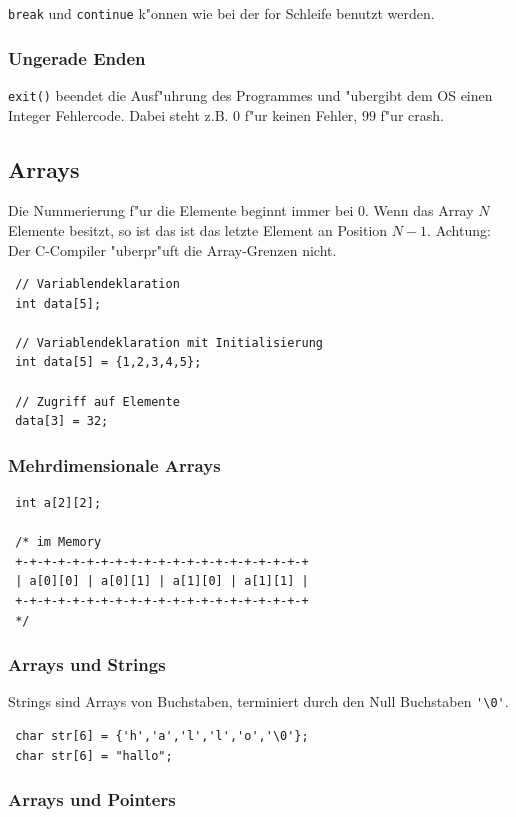 \documentclass[german, 10pt, a4paper, twocolumn]{scrartcl}
\begin{document}
\verb#break# und \verb#continue# k"onnen wie bei der for Schleife benutzt werden.

\subsubsection{Ungerade Enden}

\verb#exit()# beendet die Ausf"uhrung des Programmes und "ubergibt dem OS einen Integer Fehlercode. Dabei steht z.B. $0$ f"ur keinen Fehler, $99$ f"ur crash.

\subsection{Arrays}

Die Nummerierung f"ur die Elemente beginnt immer bei $0$. Wenn das Array $N$ Elemente besitzt, so ist das ist das letzte Element an Position $N-1$. Achtung: Der C-Compiler "uberpr"uft die Array-Grenzen nicht.

\begin{verbatim}
 // Variablendeklaration
 int data[5];
 
 // Variablendeklaration mit Initialisierung
 int data[5] = {1,2,3,4,5};

 // Zugriff auf Elemente
 data[3] = 32;
\end{verbatim}

\subsubsection{Mehrdimensionale Arrays}

\begin{verbatim}
 int a[2][2];

 /* im Memory
 +-+-+-+-+-+-+-+-+-+-+-+-+-+-+-+-+-+-+-+-+
 | a[0][0] | a[0][1] | a[1][0] | a[1][1] |
 +-+-+-+-+-+-+-+-+-+-+-+-+-+-+-+-+-+-+-+-+
 */
\end{verbatim}

\subsubsection{Arrays und Strings}

Strings sind Arrays von Buchstaben, terminiert durch den Null Buchstaben \verb#'\0'#.

\begin{verbatim}
 char str[6] = {'h','a','l','l','o','\0'};
 char str[6] = "hallo";
\end{verbatim}

\subsubsection{Arrays und Pointers}
\end{document}
